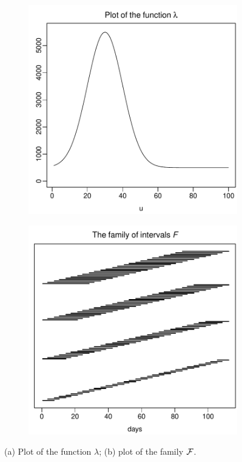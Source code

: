 \documentclass[a4paper,12pt]{article}
\numberwithin{equation}{section}
\begin{document}
\begin{figure}[t!]
\centering
\begin{subfigure}[b]{0.475\textwidth}
\includegraphics[width=\textwidth]{plots/lambda_fct}
\caption{}\label{fig:lambda}
\end{subfigure}\hspace{0.25cm}
\begin{subfigure}[b]{0.475\textwidth}
\includegraphics[width=\textwidth]{plots/all_intervals}
\caption{}\label{fig:intervals}
\end{subfigure}
\caption{(a) Plot of the function $\lambda$; (b) plot of the family $\mathcal{F}$.}\label{fig:lambda_F}
\end{figure}
\end{document}
